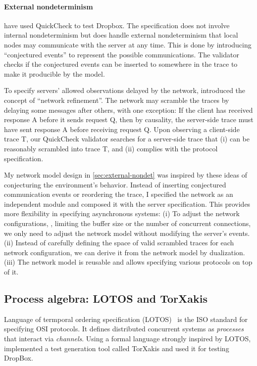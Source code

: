 \paragraph{External nondeterminism}
\citet{testing-dropbox} have used QuickCheck to test Dropbox.  The specification
does not involve internal nondeterminism but does handle external
nondeterminism that local nodes may communicate with the server at any time.
This is done by introducing ``conjectured events'' to represent the possible
communications.  The validator checks if the conjectured events can be inserted
to somewhere in the trace to make it producible by the model.

To specify servers' allowed observations delayed by the network, \citet{cpp19}
introduced the concept of ``network refinement''.  The network may scramble the
traces by delaying some messages after others, with one exception: If the client
has received response \ilc A before it sends request \ilc Q, then by causality,
the server-side trace must have sent response \ilc A before receiving request
\ilc Q.  Upon observing a client-side trace \ilc T, our QuickCheck validator
searches for a server-side trace that (i) can be reasonably scrambled into trace
\ilc T, and (ii) complies with the protocol specification.

My network model design in \autoref{sec:external-nondet} was inspired by these
ideas of conjecturing the environment's behavior.  Instead of inserting
conjectured communication events or reordering the trace, I specified the
network as an independent module and composed it with the server specification.
This provides more flexibility in specifying asynchronous systems: (i) To adjust
the network configurations, \eg, limiting the buffer size or the number of
concurrent connections, we only need to adjust the network model without
modifying the server's events.  (ii) Instead of carefully defining the space of
valid scrambled traces for each network configuration, we can derive it from the
network model by dualization.  (iii) The network model is reusable and allows
specifying various protocols on top of it.

\subsection{Process algebra: LOTOS and TorXakis}
Language of termporal ordering specification (LOTOS)~\cite{lotos} is the ISO
standard for specifying OSI protocols.  It defines distributed concurrent
systems as {\em processes} that interact via {\em channels}.  Using a formal
language strongly inspired by LOTOS, \citet{torxakis-dropbox} implemented a test
generation tool called TorXakis and used it for testing DropBox.

